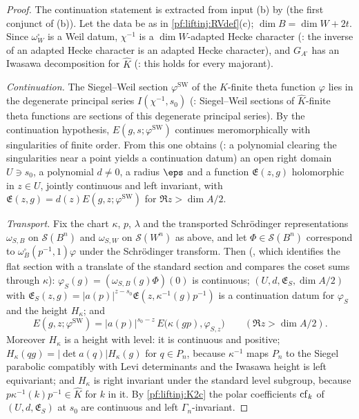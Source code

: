 \begin{proof}
The continuation statement is extracted from input (b) by  (the first conjunct of (b)). Let the data be as in
\cref{pf:liftinj:RVdef}(c); $\dim B=\dim W+2t$. Since $\omega_W^\square$ is a Weil datum, $\chi^{-1}$ is a $\dim W$-adapted Hecke character
(: the inverse of an adapted Hecke character is an adapted Hecke character), and
$G_{A^\square}$ has an Iwasawa decomposition for $\hat K$ (: this holds for every majorant).

\emph{Continuation.} The Siegel--Weil section $\varphi^{\mathrm{SW}}$ of the $\hat K$-finite theta function $\varphi$ lies in the degenerate principal
series $I(\chi^{-1},s_0)$ (: Siegel--Weil sections of $\hat K$-finite theta functions are
sections of this degenerate principal series). By the continuation hypothesis, $E(g,s;\varphi^{\mathrm{SW}})$ continues meromorphically with
singularities of finite order. From this one obtains (: a polynomial
clearing the singularities near a point yields a continuation datum) an open right domain $U\ni s_0$, a polynomial $d\ne0$, a radius $\eps$ and a
function $\mathfrak E(z,g)$ holomorphic in $z\in U$, jointly continuous and left invariant, with $\mathfrak E(z,g)=d(z)E(g,z;\varphi^{\mathrm{SW}})$ for
$\Re z>\dim A/2$.

\emph{Transport.} Fix the chart $\kappa$, $p$, $\lambda$ and the transported Schr\"odinger representations $\omega_{S,B}$ on $\mathcal S(B^n)$ and
$\omega_{S,W}$ on $\mathcal S(W^n)$ as above, and let $\Phi\in\mathcal S(B^n)$ correspond to $\omega_B^\square(p^{-1},1)\varphi$ under the
Schr\"odinger transform. Then (, which identifies the flat section with a
translate of the standard section and compares the coset sums through $\kappa$): $\varphi_S(g)=(\omega_{S,B}(g)\Phi)(0)$ is continuous;
$(U,d,\mathfrak E_S,\dim A/2)$ with $\mathfrak E_S(z,g)=|a(p)|^{z-s_0}\mathfrak E(z,\kappa^{-1}(g)p^{-1})$ is a continuation datum for $\varphi_S$ and the
height $H_\kappa$; and
\begin{equation}\label{eq:pf:liftinj:transp}
E(g,z;\varphi^{\mathrm{SW}})=|a(p)|^{s_0-z}\,E\bigl(\kappa(gp),\varphi_{S,z}\bigr)\qquad(\Re z>\dim A/2).
\end{equation}
Moreover $H_\kappa$ is a height with level: it is continuous and positive; $H_\kappa(qg)=|\det a(q)|H_\kappa(g)$ for $q\in P_n$, because
$\kappa^{-1}$ maps $P_n$ to the Siegel parabolic compatibly with Levi determinants and the Iwasawa height is left equivariant; and $H_\kappa$ is right
invariant under the standard level subgroup, because $p\kappa^{-1}(k)p^{-1}\in\hat K$ for $k$ in it. By \cref{pf:liftinj:K2c} the polar coefficients
$\operatorname{cf}_k$ of $(U,d,\mathfrak E_S)$ at $s_0$ are continuous and left $\Gamma_n$-invariant.


\end{proof}
